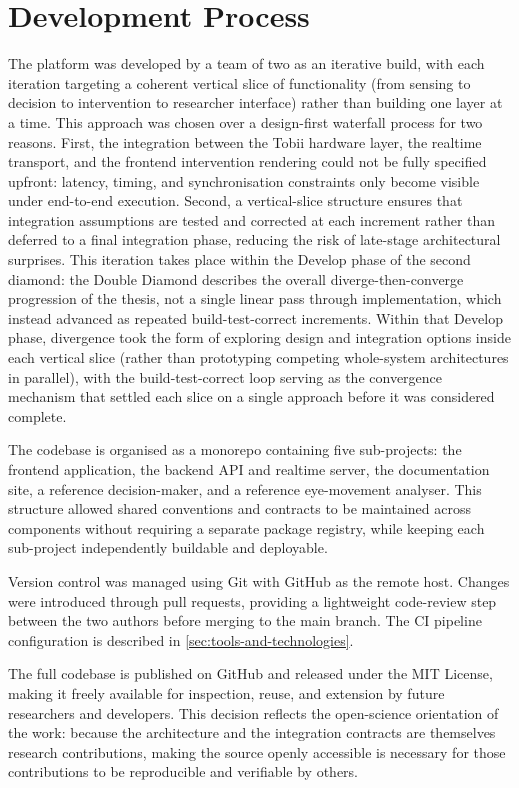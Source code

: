 \section{Development Process}
\label{sec:development-process}

The platform was developed by a team of two as an iterative build, with each iteration targeting a coherent vertical slice of functionality (from sensing to decision to intervention to researcher interface) rather than building one layer at a time.
This approach was chosen over a design-first waterfall process for two reasons.
First, the integration between the Tobii hardware layer, the realtime transport, and the frontend intervention rendering could not be fully specified upfront: latency, timing, and synchronisation constraints only become visible under end-to-end execution.
Second, a vertical-slice structure ensures that integration assumptions are tested and corrected at each increment rather than deferred to a final integration phase, reducing the risk of late-stage architectural surprises.
This iteration takes place within the Develop phase of the second diamond: the Double Diamond describes the overall diverge-then-converge progression of the thesis, not a single linear pass through implementation, which instead advanced as repeated build-test-correct increments.
Within that Develop phase, divergence took the form of exploring design and integration options inside each vertical slice (rather than prototyping competing whole-system architectures in parallel), with the build-test-correct loop serving as the convergence mechanism that settled each slice on a single approach before it was considered complete.

The codebase is organised as a monorepo containing five sub-projects: the frontend application, the backend API and realtime server, the documentation site, a reference decision-maker, and a reference eye-movement analyser.
This structure allowed shared conventions and contracts to be maintained across components without requiring a separate package registry, while keeping each sub-project independently buildable and deployable.

Version control was managed using Git with GitHub as the remote host.
Changes were introduced through pull requests, providing a lightweight code-review step between the two authors before merging to the main branch.
The CI pipeline configuration is described in \cref{sec:tools-and-technologies}.

The full codebase is published on GitHub and released under the MIT License, making it freely available for inspection, reuse, and extension by future researchers and developers.
This decision reflects the open-science orientation of the work: because the architecture and the integration contracts are themselves research contributions, making the source openly accessible is necessary for those contributions to be reproducible and verifiable by others.
